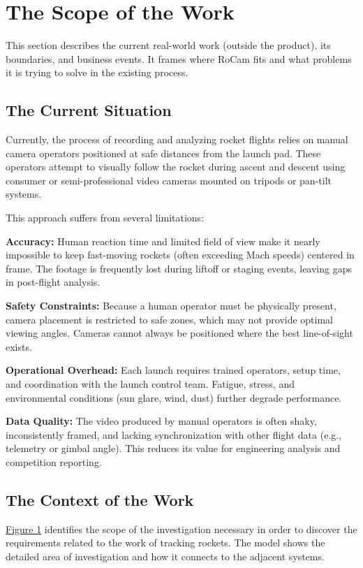 \documentclass[12pt]{article}
\begin{document}
\section{The Scope of the Work}
This section describes the current real-world work (outside the product), its
boundaries, and business events. It frames where RoCam fits and what problems
it is trying to solve in the existing process.

\subsection{The Current Situation}

Currently, the process of recording and analyzing rocket flights relies on
manual camera operators positioned at safe distances from the launch pad. These
operators attempt to visually follow the rocket during ascent and descent using
consumer or semi-professional video cameras mounted on tripods or pan-tilt
systems.

This approach suffers from several limitations:

\textbf{Accuracy:} Human reaction time and limited field of view make it nearly
impossible to keep fast-moving rockets (often exceeding Mach speeds) centered
in frame. The footage is frequently lost during liftoff or staging events,
leaving gaps in post-flight analysis.

\textbf{Safety Constraints:} Because a human operator must be physically present, camera
placement is restricted to safe zones, which may not provide optimal viewing
angles. Cameras cannot always be positioned where the best line-of-sight
exists.

\textbf{Operational Overhead:} Each launch requires trained operators, setup time, and
coordination with the launch control team. Fatigue, stress, and environmental
conditions (sun glare, wind, dust) further degrade performance.

\textbf{Data Quality:} The video produced by manual operators is often shaky,
inconsistently framed, and lacking synchronization with other flight data
(e.g., telemetry or gimbal angle). This reduces its value for engineering
analysis and competition reporting.

\subsection{The Context of the Work}

\hyperref[img:context-of-work]{Figure 1} identifies the scope of the
investigation necessary in order to discover the requirements related to the
work of tracking rockets. The model shows the detailed area of investigation
and how it connects to the adjacent systems.
\end{document}
